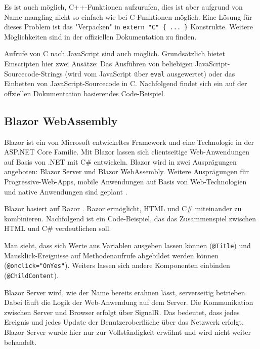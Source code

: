 

Es ist auch möglich, C++-Funktionen aufzurufen, dies ist aber aufgrund von Name mangling nicht so einfach wie bei C-Funktionen möglich. Eine Lösung für dieses Problem ist das "Verpacken" in \lstinline|extern "C" { ... }| Konstrukte. Weitere Möglichkeiten sind in der offiziellen Dokumentation zu finden.

Aufrufe von C nach JavaScript sind auch möglich. Grundsätzlich bietet Emscripten hier zwei Ansätze: Das Ausführen von beliebigen JavaScript-Sourcecode-Strings (wird vom JavaScript über \lstinline{eval} ausgewertet) oder das Einbetten von JavaScript-Sourcecode in C. Nachfolgend findet sich ein auf der offziellen Dokumentation basierendes Code-Beispiel.



\subsection{Blazor WebAssembly}
Blazor \cite{Blazor} ist ein von Microsoft entwickeltes Framework und eine Technologie in der ASP.NET Core Familie. Mit Blazor lassen sich clientseitige Web-Anwendungen auf Basis von .NET mit C\#{} entwickeln. Blazor wird in zwei Ausprägungen angeboten: Blazor Server und Blazor WebAssembly. Weitere Ausprägungen für Progressive-Web-Apps, mobile Anwendungen auf Basis von Web-Technologien und native Anwendungen sind geplant \cite{BlazorBlog}.

Blazor basiert auf Razor \cite{Razor}. Razor ermöglicht, HTML und C\#{} miteinander zu kombinieren. Nachfolgend ist ein Code-Beispiel, das das Zusammenspiel zwischen HTML und C\#{} verdeutlichen soll.



Man sieht, dass sich Werte aus Variablen ausgeben lassen können (\lstinline{@Title}) und Maus\-klick-Ereignisse auf Methodenaufrufe abgebildet werden können (\lstinline{@onclick="OnYes"}). Weiters lassen sich andere Komponenten einbinden (\lstinline{@ChildContent}).

Blazor Server wird, wie der Name bereits erahnen lässt, serverseitig betrieben. Dabei läuft die Logik der Web-Anwendung auf dem Server. Die Kommunikation zwischen Server und Browser erfolgt über SignalR. Das bedeutet, dass jedes Ereignis und jedes Update der Benutzeroberfläche über das Netzwerk erfolgt. Blazor Server wurde hier nur zur Vollständigkeit erwähnt und wird nicht weiter behandelt.

